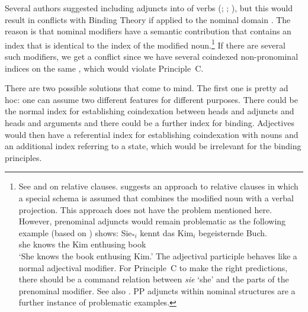 \documentclass[output=paper
 	        ,biblatex
                ,babelshorthands
                ,newtxmath
                ,draftmode
                ,colorlinks, citecolor=brown
]{langscibook}
\begin{document}
Several authors suggested including adjuncts into \argstls of verbs
(\citealp[]{Chung98}; \citealp[]{Prze99}; \citealp*[]{MSI99a}), but this would
result in conflicts with Binding Theory if applied to the nominal domain \citep[Section~20.4.1.]{Mueller99a}. The reason is that nominal modifiers have a semantic contribution that
contains an index that is identical to the index of the modified noun.\footnote{%
See  and
 on relative clauses. \citet{Sag97a} suggests an approach to relative clauses in
which a special schema is assumed that combines the modified noun with a verbal projection. This
approach does not have the problem mentioned here. However, prenominal adjuncts would remain
problematic as the following example (based on \citealt[]{Mueller99a}) shows:
\ea
\gll Sie$_{*i}$ kennt das Kim$_i$ begeisternde Buch.\\
     she        knows the Kim     enthusing    book\\
\glt `She knows the book enthusing Kim.'
\z
The adjectival participle behaves like a normal adjectival modifier. For Principle~C to make the
right predictions, there should be a command relation between \emph{sie} `she' and the parts of the
prenominal modifier. See also
\crossrefchapterw[\pageref{relative-clauses:fn-page-to-be-read}]{relative-clauses}. PP adjuncts
within nominal structures are a further instance of problematic examples.%
} If there are several such modifiers, we get a conflict since we have several coindexed non-pronominal indices on the same
\argstl, which would violate Principle~C. 

There are two possible solutions that come to mind. The first one is pretty ad
hoc: one can assume two different features for different purposes. There could be the normal index
for establishing coindexation between heads and adjuncts and heads and arguments and there could be
a further index for binding. Adjectives would then have a referential index for establishing
coindexation with nouns and an additional index referring to a state, which would be irrelevant for the
binding principles.
\end{document}
